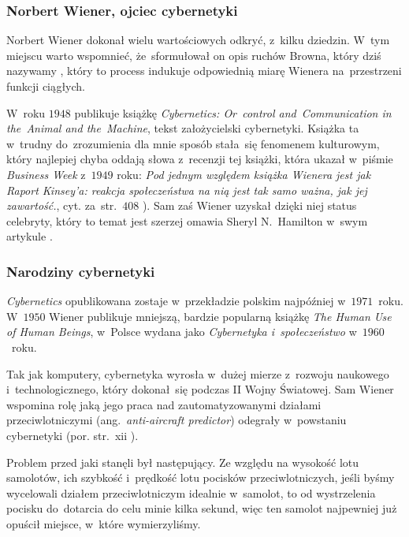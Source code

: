 \documentclass[10pt,t]{beamer}
\begin{document}
\begin{frame}
  \frametitle{Norbert Wiener, ojciec cybernetyki}


  Norbert Wiener dokonał wielu wartościowych odkryć, z~kilku dziedzin.
  W~tym miejscu warto wspomnieć, że~sformułował on opis ruchów Browna,
  który dziś nazywamy
  , który to process indukuje odpowiednią miarę Wienera
  na~przestrzeni funkcji ciągłych.

  W~roku $1948$ publikuje książkę
  {\textit{Cybernetics: Or~control and~Communication in the~Animal and
      the~Machine}}, tekst założycielski cybernetyki. Książka ta w~trudny
  do~zrozumienia dla mnie sposób stała~się fenomenem kulturowym, który
  najlepiej chyba oddają słowa z~recenzji tej książki, która ukazał
  w~piśmie \textit{Business Week} z~$1949$ roku: \textit{Pod jednym
    względem książka Wienera jest jak Raport Kinsey’a: reakcja
    społeczeństwa na nią jest tak samo ważna, jak jej zawartość.}, cyt.
  za~str.~$408$
  \parencite{Hamilton-The-Charismatic-Cultural-Life-of-ETC-Pub-2017}). Sam
  zaś Wiener uzyskał dzięki niej status celebryty, który to temat jest
  szerzej omawia Sheryl N.~Hamilton w~swym artykule
  \parencite{Hamilton-The-Charismatic-Cultural-Life-of-ETC-Pub-2017}.

\end{frame}





\begin{frame}
  \frametitle{Narodziny cybernetyki}


  \textit{Cybernetics} opublikowana zostaje w~przekładzie polskim najpóźniej
  w~$1971$~roku. W~$1950$ Wiener publikuje mniejszą, bardzie popularną
  książkę 
  {\textit{The Human Use of Human Beings}}, w~Polsce wydana jako
  \textit{Cybernetyka i~społeczeństwo} w~$1960$~roku.

  Tak jak komputery, cybernetyka wyrosła w~dużej mierze z~rozwoju naukowego
  i~technologicznego, który dokonał~się podczas II Wojny Światowej. Sam
  Wiener wspomina rolę jaką jego praca nad zautomatyzowanymi działami
  przeciwlotniczymi (ang.~\textit{anti-aircraft predictor}) odegrały
  w~powstaniu cybernetyki (por. str.~xii
  \parencite{Wiener-Cybernetics-Second-edition-Pub-2016}).

  Problem przed jaki stanęli był następujący. Ze względu na wysokość lotu
  samolotów, ich szybkość i~prędkość lotu pocisków przeciwlotniczych, jeśli
  byśmy wycelowali działem przeciwlotniczym idealnie w~samolot, to od
  wystrzelenia pocisku do~dotarcia do celu minie kilka sekund, więc ten
  samolot najpewniej już opuścił miejsce, w~które wymierzyliśmy.

\end{frame}
\end{document}

